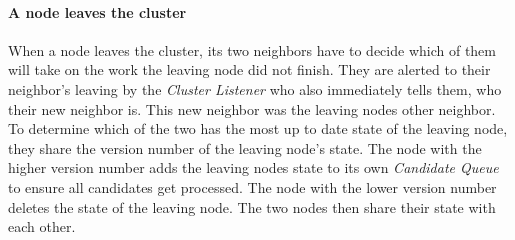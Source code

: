   \paragraph{A node leaves the cluster}
  When a node leaves the cluster, its two neighbors have to decide which of them will take on the work the leaving node did not finish.
  They are alerted to their neighbor's leaving by the \emph{Cluster Listener} who also immediately tells them, who their new neighbor is.
  This new neighbor was the leaving nodes other neighbor.
  To determine which of the two has the most up to date state of the leaving node, they share the version number of the leaving node's state. 
  The node with the higher version number adds the leaving nodes state to its own \emph{Candidate Queue} to ensure all candidates get processed. 
  The node with the lower version number deletes the state of the leaving node.
  The two nodes then share their state with each other. 